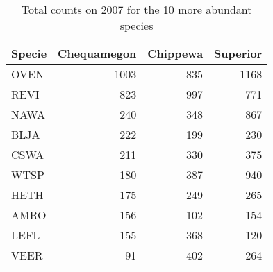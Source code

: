 \begin{table}[ht]
\begin{center}
\caption{Total counts on 2007 for the 10 more abundant species}
\begin{tabular}{lrrr}
  \hline
Specie & Chequamegon & Chippewa & Superior \\ 
  \hline
OVEN & 1003 & 835 & 1168 \\ 
  REVI & 823 & 997 & 771 \\ 
  NAWA & 240 & 348 & 867 \\ 
  BLJA & 222 & 199 & 230 \\ 
  CSWA & 211 & 330 & 375 \\ 
  WTSP & 180 & 387 & 940 \\ 
  HETH & 175 & 249 & 265 \\ 
  AMRO & 156 & 102 & 154 \\ 
  LEFL & 155 & 368 & 120 \\ 
  VEER &  91 & 402 & 264 \\ 
   \hline
\end{tabular}
\end{center}
\end{table}
